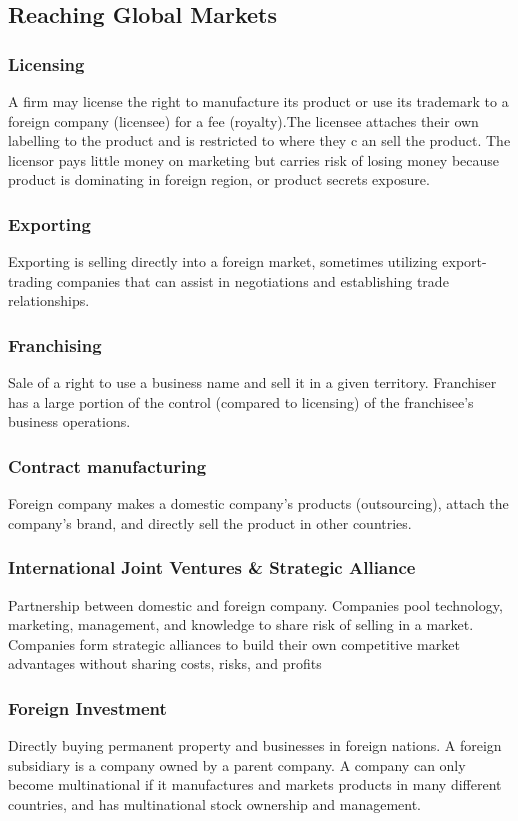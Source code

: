 \documentclass[english, 12pt]{article}
\begin{document}
\subsection{Reaching Global Markets}
\subsubsection*{Licensing}
A firm may license the right to manufacture its product or use its trademark to a foreign company (licensee) for a fee (royalty).The licensee attaches their own labelling to the product and is restricted to where they c an sell the product. The licensor pays little money on marketing but carries risk of losing money because product is dominating in foreign region, or product secrets exposure.
\subsubsection*{Exporting}
Exporting is selling directly into a foreign market, sometimes utilizing export-trading companies that can assist in negotiations and establishing trade relationships.
\subsubsection*{Franchising}
Sale of a right to use a business name and sell it in a given territory. Franchiser has a large portion of the control (compared to licensing) of the franchisee's business operations.

\subsubsection*{Contract manufacturing}
Foreign company makes a domestic company's products (outsourcing), attach the company's brand, and directly sell the product in other countries.

\subsubsection*{International Joint Ventures \& Strategic Alliance}
Partnership between domestic and foreign company. Companies pool technology, marketing, management, and knowledge to share risk of selling in a market. Companies form strategic alliances to build their own competitive market advantages without sharing costs, risks, and profits

\subsubsection*{Foreign Investment}
Directly buying permanent property and businesses in foreign nations. A foreign subsidiary is a company owned by a parent company. A company can only become multinational if it manufactures and markets products in many different countries, and has multinational stock ownership and management.
\end{document}
